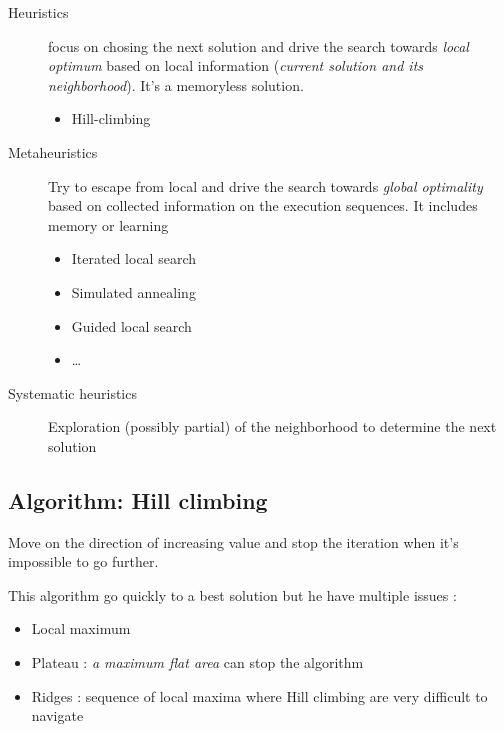 \begin{description}

    \item[Heuristics] focus on  chosing the next solution  and drive the
    search  towards \textit{local  optimum} based  on local  information
    (\textit{current solution and its  neighborhood}). It's a memoryless
    solution.

        \begin{itemize}
            \item Hill-climbing
            \end{itemize}

    \item[Metaheuristics] Try to escape from  local and drive the search
    towards  \textit{global optimality}  based on  collected information
    on  the   execution  sequences.  It  includes   memory  or  learning

        \begin{itemize}
            \item Iterated local search
            \item Simulated annealing
            \item Guided local search
            \item \ldots
            \end{itemize}

    \item[Systematic heuristics]  Exploration (possibly partial)  of the
neighborhood to determine the next solution

\end{description}

\subsection{Algorithm: Hill climbing}

Move on  the direction of increasing  value and stop the  iteration when
it's impossible to go further.

This algorithm go quickly to a best solution but he have multiple issues :
\begin{itemize}
    \item Local maximum 
    \item Plateau : \textit{a maximum flat area} can stop the algorithm
    \item Ridges : sequence of local maxima where Hill climbing are very difficult to navigate
\end{itemize}


